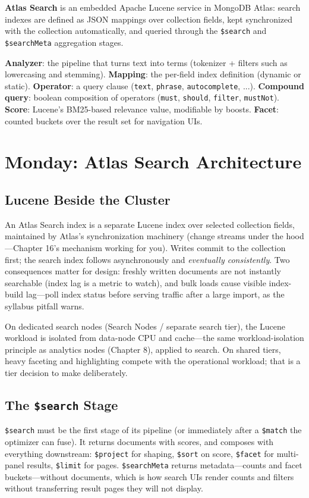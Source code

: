 \begin{definitionbox}
\textbf{Atlas Search} is an embedded Apache Lucene service in MongoDB Atlas: search indexes are defined as JSON mappings over collection fields, kept synchronized with the collection automatically, and queried through the \texttt{\$search} and \texttt{\$searchMeta} aggregation stages.
\end{definitionbox}

\begin{keyterms}
\textbf{Analyzer}: the pipeline that turns text into terms (tokenizer + filters such as lowercasing and stemming). \textbf{Mapping}: the per-field index definition (dynamic or static). \textbf{Operator}: a query clause (\texttt{text}, \texttt{phrase}, \texttt{autocomplete}, ...). \textbf{Compound query}: boolean composition of operators (\texttt{must}, \texttt{should}, \texttt{filter}, \texttt{mustNot}). \textbf{Score}: Lucene's BM25-based relevance value, modifiable by boosts. \textbf{Facet}: counted buckets over the result set for navigation UIs.
\end{keyterms}

\section{Monday: Atlas Search Architecture}
\subsection{Lucene Beside the Cluster}
An Atlas Search index is a separate Lucene index over selected collection fields, maintained by Atlas's synchronization machinery (change streams under the hood---Chapter 16's mechanism working for you). Writes commit to the collection first; the search index follows asynchronously and \emph{eventually consistently}. Two consequences matter for design: freshly written documents are not instantly searchable (index lag is a metric to watch), and bulk loads cause visible index-build lag---poll index status before serving traffic after a large import, as the syllabus pitfall warns.

On dedicated search nodes (Search Nodes / separate search tier), the Lucene workload is isolated from data-node CPU and cache---the same workload-isolation principle as analytics nodes (Chapter 8), applied to search. On shared tiers, heavy faceting and highlighting compete with the operational workload; that is a tier decision to make deliberately.

\subsection{The \texttt{\$search} Stage}
\texttt{\$search} must be the first stage of its pipeline (or immediately after a \texttt{\$match} the optimizer can fuse). It returns documents with scores, and composes with everything downstream: \texttt{\$project} for shaping, \texttt{\$sort} on score, \texttt{\$facet} for multi-panel results, \texttt{\$limit} for pages. \texttt{\$searchMeta} returns metadata---counts and facet buckets---without documents, which is how search UIs render counts and filters without transferring result pages they will not display.

